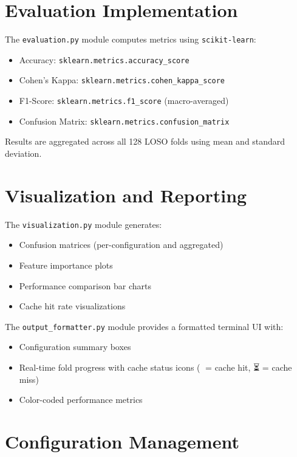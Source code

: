 \section{Evaluation Implementation}
\label{sec:eval_impl}

The \texttt{evaluation.py} module computes metrics using \texttt{scikit-learn}:

\begin{itemize}
    \item Accuracy: \texttt{sklearn.metrics.accuracy\_score}
    \item Cohen's Kappa: \texttt{sklearn.metrics.cohen\_kappa\_score}
    \item F1-Score: \texttt{sklearn.metrics.f1\_score} (macro-averaged)
    \item Confusion Matrix: \texttt{sklearn.metrics.confusion\_matrix}
\end{itemize}

Results are aggregated across all 128 LOSO folds using mean and standard deviation.

\section{Visualization and Reporting}
\label{sec:visualization_impl}

The \texttt{visualization.py} module generates:

\begin{itemize}
    \item Confusion matrices (per-configuration and aggregated)
    \item Feature importance plots
    \item Performance comparison bar charts
    \item Cache hit rate visualizations
\end{itemize}

The \texttt{output\_formatter.py} module provides a formatted terminal UI with:

\begin{itemize}
    \item Configuration summary boxes
    \item Real-time fold progress with cache status icons (💾 = cache hit, ⏳ = cache miss)
    \item Color-coded performance metrics
\end{itemize}

\section{Configuration Management}
\label{sec:config_impl}

